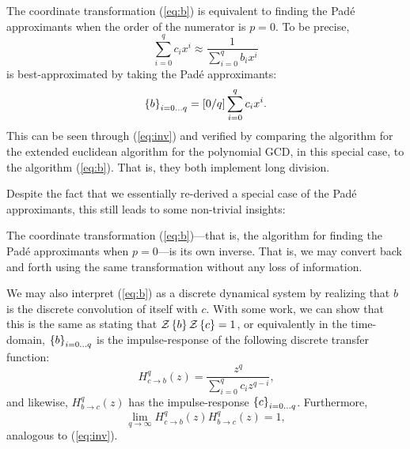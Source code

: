 The coordinate transformation (\ref{eq:b}) is equivalent to finding the Pad\'e approximants when the order of the numerator is $p = 0$.
To be precise,
$$
\sum_{i=0}^{q} c_i x^i \approx \frac{1}{\sum_{i=0}^q b_i x^i}
$$
is best-approximated by taking the Pad\'e approximants:
$$
\left\{ b \right\}_{i=0 \ldots q} = \left[ 0 / q \right] \sum_{i=0}^{q} c_i x^i \text{.}
$$
This can be seen through (\ref{eq:inv}) and verified by comparing the algorithm for the extended euclidean algorithm for the polynomial GCD, in this special case, to the algorithm (\ref{eq:b}). That is, they both implement long division.

Despite the fact that we essentially re-derived a special case of the Pad\'e approximants, this still leads to some non-trivial insights:

The coordinate transformation (\ref{eq:b})---that is, the algorithm for finding the Pad\'e approximants when $p = 0$---is its own inverse. That is, we may convert back and forth using the same transformation without any loss of information.

We may also interpret (\ref{eq:b}) as a discrete dynamical system by realizing that $b$ is the discrete convolution of itself with $c$. With some work, we can show that this is the same as stating that $\mathcal{Z} \left\{ b \right\}\mathcal{Z} \left\{ c \right\} = 1$, or equivalently in the time-domain, $\left\{ b \right\}_{i=0\ldots q}$ is the impulse-response of the following discrete transfer function:
$$
H^q_{c \rightarrow b}(z) = \frac{z^{q}}{\sum_{i=0}^q c_i z^{q - i}} \text{,}
$$
and likewise, $H^q_{b \rightarrow c}(z)$ has the impulse-response $\left\{ c \right\}_{i=0\ldots q}$.
Furthermore, $$\lim_{q \rightarrow \infty} H^q_{c \rightarrow b}(z) H^q_{b \rightarrow c}(z) = 1,$$ analogous to (\ref{eq:inv}).
